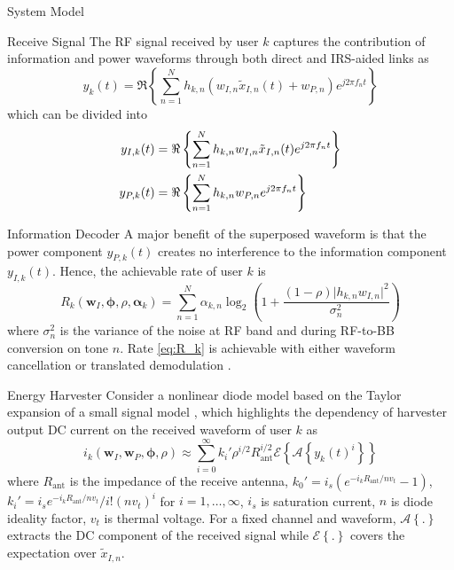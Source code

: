 \documentclass{IEEEtran}
\begin{document}
\begin{section}{System Model}
	\begin{subsection}{Receive Signal}
		The RF signal received by user $k$ captures the contribution of information and power waveforms through both direct and IRS-aided links as
		\begin{equation}\label{eq:y_k}
			y_k(t)=\Re\left\{\sum_{n=1}^N{h_{{k,n}}}\left({w_{I,n}\tilde{x}_{I,n}(t)}+w_{P,n}\right){e^{j2{\pi}{f_n}{t}}}\right\}
		\end{equation}
		which can be divided into
		\begin{align}\label{eq:y_{I/P,k}}
			y_{I,k}(t) & = \Re\left\{\sum_{n=1}^N{h_{{k,n}}}{w_{I,n}\tilde{x}_{I,n}(t)}{e^{j2{\pi}{f_n}{t}}}\right\}\\
			y_{P,k}(t) & = \Re\left\{\sum_{n=1}^N{h_{{k,n}}}w_{P,n}{e^{j2{\pi}{f_n}{t}}}\right\}
		\end{align}
	\end{subsection}

	\begin{subsection}{Information Decoder}
		A major benefit of the superposed waveform is that the power component $y_{P,k}(t)$ creates no interference to the information component $y_{I,k}(t)$. Hence, the achievable rate of user $k$ is
		\begin{equation}\label{eq:R_k}
			R_k(\boldsymbol{w}_I,\boldsymbol{\phi},\rho,\boldsymbol{\alpha}_k)=\sum_{n=1}^N\alpha_{k,n}{\log_2\left(1+\frac{(1-\rho)\lvert h_{k,n}w_{I,n} \rvert^2}{\sigma_n^2}\right)}
		\end{equation}
		where $\sigma_n^2$ is the variance of the noise at RF band and during RF-to-BB conversion on tone $n$. Rate \ref{eq:R_k} is achievable with either waveform cancellation or translated demodulation \cite{Clerckx2018b}.
	\end{subsection}

	\begin{subsection}{Energy Harvester}
		Consider a nonlinear diode model based on the Taylor expansion of a small signal model \cite{Clerckx2016a,Clerckx2018b}, which highlights the dependency of harvester output DC current on the received waveform of user $k$ as
		\begin{equation}\label{eq:i_k}
			i_k(\boldsymbol{w}_I,\boldsymbol{w}_P,\boldsymbol{\phi},\rho)\approx\sum_{i=0}^{\infty}{k_i'}{\rho^{i/2}}{R_{\text{ant}}^{i/2}}\mathcal{E}\left\{{\mathcal{A}\left\{y_k(t)^i\right\}}\right\}
		\end{equation}
		where $R_{\text{ant}}$ is the impedance of the receive antenna, $k_0'=i_s(e^{-i_kR_{\text{ant}}/nv_t}-1)$, $k_i'=i_se^{-i_kR_{\text{ant}}/nv_t}/i!(nv_t)^i$ for $i=1,\dots,\infty$, $i_s$ is saturation current, $n$ is diode ideality factor, $v_t$ is thermal voltage. For a fixed channel and waveform, $\mathcal{A}\left\{.\right\}$ extracts the DC component of the received signal while $\mathcal{E}\left\{.\right\}$ covers the expectation over $\tilde{x}_{I,n}$.


\end{subsection}
\end{section}
\end{document}
